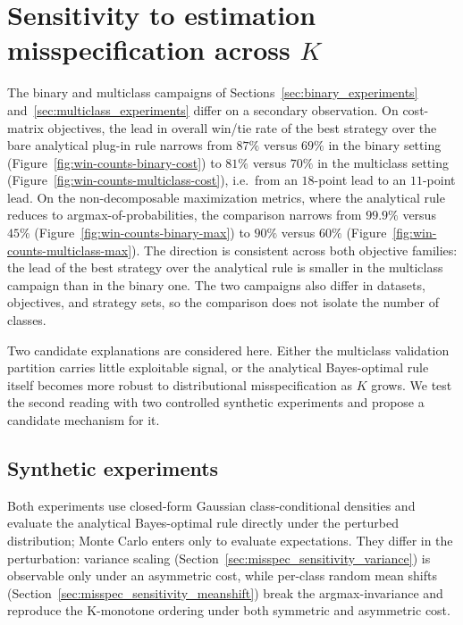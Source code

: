 \chapter{Sensitivity to estimation misspecification across $K$}\label{sec:misspec_sensitivity_K}

The binary and multiclass campaigns of Sections~\ref{sec:binary_experiments} and~\ref{sec:multiclass_experiments} differ on a secondary observation. On cost-matrix objectives, the lead in overall win/tie rate of the best strategy over the bare analytical plug-in rule narrows from $87\%$ versus $69\%$ in the binary setting (Figure~\ref{fig:win-counts-binary-cost}) to $81\%$ versus $70\%$ in the multiclass setting (Figure~\ref{fig:win-counts-multiclass-cost}), i.e.\ from an $18$-point lead to an $11$-point lead. On the non-decomposable maximization metrics, where the analytical rule reduces to argmax-of-probabilities, the comparison narrows from $99.9\%$ versus $45\%$ (Figure~\ref{fig:win-counts-binary-max}) to $90\%$ versus $60\%$ (Figure~\ref{fig:win-counts-multiclass-max}). The direction is consistent across both objective families: the lead of the best strategy over the analytical rule is smaller in the multiclass campaign than in the binary one. The two campaigns also differ in datasets, objectives, and strategy sets, so the comparison does not isolate the number of classes.

Two candidate explanations are considered here. Either the multiclass validation partition carries little exploitable signal, or the analytical Bayes-optimal rule itself becomes more robust to distributional misspecification as $K$ grows. We test the second reading with two controlled synthetic experiments and propose a candidate mechanism for it.

\section{Synthetic experiments}\label{sec:misspec_sensitivity_experiments}

Both experiments use closed-form Gaussian class-conditional densities and evaluate the analytical Bayes-optimal rule directly under the perturbed distribution; Monte Carlo enters only to evaluate expectations. They differ in the perturbation: variance scaling (Section~\ref{sec:misspec_sensitivity_variance}) is observable only under an asymmetric cost, while per-class random mean shifts (Section~\ref{sec:misspec_sensitivity_meanshift}) break the argmax-invariance and reproduce the K-monotone ordering under both symmetric and asymmetric cost.

